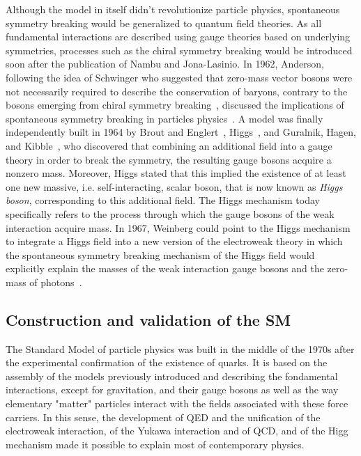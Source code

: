	Although the model in itself didn't revolutionize particle physics, spontaneous symmetry breaking would be generalized to quantum field theories. As all fundamental interactions are described using gauge theories based on underlying symmetries, processes such as the chiral symmetry breaking would be introduced soon after the publication of Nambu and Jona-Lasinio. In 1962, Anderson, following the idea of Schwinger who suggested that zero-mass vector bosons were not necessarily required to describe the conservation of baryons, contrary to the bosons emerging from chiral symmetry breaking~\cite{SCHWINGER1962}, discussed the implications of spontaneous symmetry breaking in particles physics~\cite{ANDERSON1963}. A model was finally independently built in 1964 by Brout and Englert~\cite{ENGLERT1964}, Higgs~\cite{HIGGS1964}, and Guralnik, Hagen, and Kibble~\cite{GURALNIK1964}, who discovered that combining an additional field into a gauge theory in order to break the symmetry, the resulting gauge bosons acquire a nonzero mass. Moreover, Higgs stated that this implied the existence of at least one new massive, i.e. self-interacting, scalar boson, that is now known as \textit{Higgs boson}, corresponding to this additional field. The Higgs mechanism today specifically refers to the process through which the gauge bosons of the weak interaction acquire mass. In 1967, Weinberg could point to the Higgs mechanism to integrate a Higgs field into a new version of the electroweak theory in which the spontaneous symmetry breaking mechanism of the Higgs field would explicitly explain the masses of the weak interaction gauge bosons and the zero-mass of photons~\cite{WEINBERG1967}.
	
	\subsection{Construction and validation of the \acl{SM}}
	\label{chapt2:ssec:model}
	
	The Standard Model of particle physics was built in the middle of the 1970s after the experimental confirmation of the existence of quarks. It is based on the assembly of the models previously introduced and describing the fondamental interactions, except for gravitation, and their gauge bosons as well as the way elementary "matter" particles interact with the fields associated with these force carriers. In this sense, the development of QED and the unification of the electroweak interaction, of the Yukawa interaction and of QCD, and of the Higg mechanism made it possible to explain most of contemporary physics.
	
